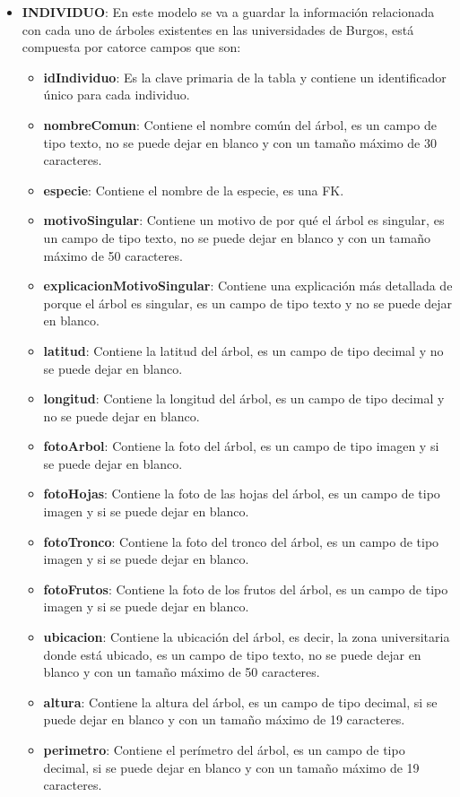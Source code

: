 \begin{itemize}
	\item \textbf{INDIVIDUO}: En este modelo se va a guardar la información relacionada con cada uno de árboles existentes en las universidades de Burgos, está compuesta por catorce campos que son:
	\begin{itemize}
		\item \textbf{idIndividuo}: Es la clave primaria de la tabla y contiene un identificador único para cada individuo.
		\item \textbf{nombreComun}: Contiene el nombre común del árbol, es un campo de tipo texto, no se puede dejar en blanco y con un tamaño máximo de 30 caracteres. 
		\item \textbf{especie}: Contiene el nombre de la especie, es una FK.
		\item \textbf{motivoSingular}: Contiene un motivo de por qué el árbol es singular, es un campo de tipo texto, no se puede dejar en blanco y con un tamaño máximo de 50 caracteres. 
		\item \textbf{explicacionMotivoSingular}: Contiene una explicación más detallada de porque el árbol es singular, es un campo de tipo texto y no se puede dejar en blanco.
		\item \textbf{latitud}: Contiene la latitud del árbol, es un campo de tipo decimal y no se puede dejar en blanco.
		\item \textbf{longitud}: Contiene la longitud del árbol, es un campo de tipo decimal y no se puede dejar en blanco.
		\item \textbf{fotoArbol}: Contiene la foto del árbol, es un campo de tipo imagen y si se puede dejar en blanco.
		\item \textbf{fotoHojas}: Contiene la foto de las hojas del árbol, es un campo de tipo imagen y si se puede dejar en blanco.
		\item \textbf{fotoTronco}: Contiene la foto del tronco del árbol, es un campo de tipo imagen y si se puede dejar en blanco.
		\item \textbf{fotoFrutos}: Contiene la foto de los frutos del árbol, es un campo de tipo imagen y si se puede dejar en blanco.
		\item \textbf{ubicacion}: Contiene la ubicación del árbol, es decir, la zona universitaria donde está ubicado, es un campo de tipo texto, no se puede dejar en blanco y con un tamaño máximo de 50 caracteres.
		\item \textbf{altura}: Contiene la altura del árbol, es un campo de tipo decimal, si se puede dejar en blanco y con un tamaño máximo de 19 caracteres.
		\item \textbf{perimetro}: Contiene el perímetro del árbol, es un campo de tipo decimal, si se puede dejar en blanco y con un tamaño máximo de 19 caracteres.  
	\end{itemize}
\end{itemize}

